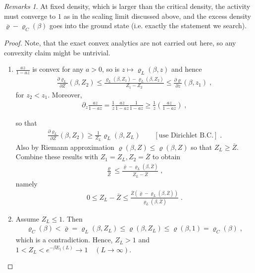 \documentclass[
a4paper, %
11pt, %
onecolumn, %
openany, %
]{memoir}
\theoremstyle{definition}
\theoremstyle{remark}
\newtheorem{remarks}[definition]{Remarks}
\theoremstyle{plain}
\begin{document}
\begin{remarks}
	At fixed density, which is larger than the critical density, the activity must converge to $1$ as in the scaling limit discussed above, and the excess density $\overline{\varrho}-\varrho_C(\beta)$ goes into the ground state (i.e. exactly the statement we search).
\end{remarks}
\begin{proof}
	Note, that the exact convex analytics are not carried out here, so any convexity claim might be untrivial.\begin{enumerate}
	\item $\frac{az}{1-az}$ is convex for any $a>0$, so is $z\mapsto \varrho_L(\beta,z)$ and hence \begin{align}
	\frac{\partial \varrho_L}{\partial Z}(\beta, Z_2)\leq \frac{\varrho_{L}(\beta,Z_1)-\varrho_L(\beta,Z_2)}{Z_1-Z_2}\leq \frac{\partial \varrho}{\partial z}(\beta,z_1)\;,
	\end{align}
	for $z_2<z_1$. Moreover, \begin{align}\partial_z\frac{az}{1-az}=\frac{1}{z}\frac{az}{1-az}\frac{1}{1-az}\geq \frac{1}{z}\left(\frac{az}{1-az}\right)\; ,\end{align}

so that \begin{align}
\frac{\partial \varrho_L}{\partial Z}(\beta,Z_2)\geq \frac{1}{Z_L}\varrho_L(\beta,Z_L)\qquad [\text{use Dirichlet B.C.}]\; .
\end{align}
Also by Riemann approximation $\varrho(\beta,Z)\leq \varrho(\beta,Z)$ so that $Z_L\geq \overline{Z}$.  Combine these results with $Z_1=Z_L, Z_2=\overline{Z}$ to obtain \begin{align}
\frac{\varrho}{\overline{Z}}\leq \frac{\overline{\varrho}-\varrho_{L}(\beta,\overline{Z})}{Z_L-\overline{Z}}\; ,
\end{align}
namely \begin{align}
0\leq Z_L-\overline{Z}\leq \frac{\overline{Z}(\overline{\varrho}-\varrho_{L}(\beta,\overline{Z}))}{\varrho_L(\beta,\overline{Z})}\;.
\end{align}
\item Assume $Z_L\leq 1$. Then \begin{align}
\varrho_C(\beta)<\overline{\varrho}=\varrho_L(\beta,Z_L)\leq \varrho(\beta,Z_L)\leq \varrho(\beta,1)=\varrho_C(\beta)\; ,
\end{align}
which is a contradiction. Hence, $Z_L>1$ and $1<Z_L<e^{-\beta E_{\underline{1}}(L)}\rightarrow 1 \quad (L\rightarrow\infty)$.
\end{enumerate}
\end{proof}
\end{document}
